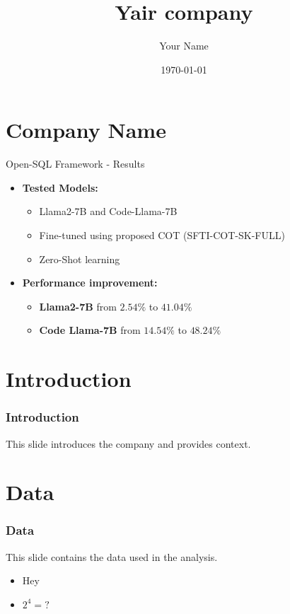 \documentclass{beamer}%
\title{Yair company}%
\author{Your Name}%
\date{\today}%
\begin{document}
%
\normalsize%
\section{Company Name}%
\label{sec:CompanyName}%

         \begin{frame}{ Open-SQL Framework - Results}
    \begin{itemize}
        \item \textbf{Tested Models:}
        \begin{itemize}
            \item Llama2-7B and Code-Llama-7B
            \item Fine-tuned using proposed COT (SFTI-COT-SK-FULL)
            \item Zero-Shot learning
        \end{itemize}

   
        \item \textbf{Performance improvement:}
        \begin{itemize}
            \item \textbf{Llama2-7B}  from \(2.54\%\) to \(41.04\%\)
            \item \textbf{Code Llama-7B}  from \(14.54\%\) to \(48.24\%\)
        \end{itemize}
    \end{itemize}
\end{frame}
        

%
\section{Introduction}%
\label{sec:Introduction}%
\begin{frame}%
\frametitle{Introduction}%
This slide introduces the company and provides context.%
\end{frame}

%
\section{Data}%
\label{sec:Data}%
\begin{frame}%
\frametitle{Data}%
This slide contains the data used in the analysis.%
\begin{itemize}%
\item Hey%
\item $2^4 = ?$%
\end{itemize}%
\end{frame}
\end{document}
